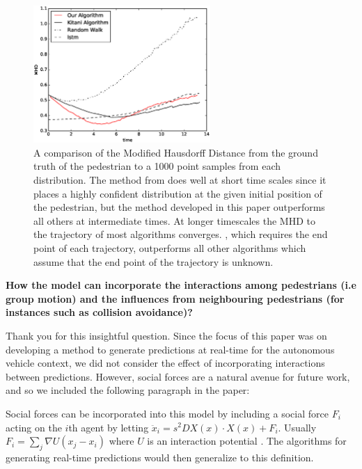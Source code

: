 \documentclass[usenames,dvipsnames]{article}
\providecommand{\response}[1]{
\noindent
\noindent\colorbox{gray!20}{
\parbox{\textwidth}{
\setlength{\parskip}{.1in}
\setlength{\parindent}{.1in}
#1}
}
}
\begin{document}
\begin{enumerate}
\begin{item}
\end{item}
\begin{figure}
	\centering
	\includegraphics[width=0.6\textwidth]{figures/mhd_results.eps}
	\caption{A comparison of the Modified Hausdorff Distance from the ground truth of the pedestrian to a 1000 point samples from each distribution. The method from \cite{Alahi2016} does well at short time scales since it places a highly confident distribution at the given initial position of the pedestrian, but the method developed in this paper outperforms all others at intermediate times. At longer timescales the MHD to the trajectory of most algorithms converges. \cite{Kitani2012}, which requires the end point of each trajectory, outperforms all other algorithms which assume that the end point of the trajectory is unknown.}
   \reversemarginpar{}
	\label{MHD}
\end{figure}

\begin{item}
\textbf{How the model can incorporate the interactions among pedestrians (i.e
group motion) and the influences from neighbouring pedestrians (for
instances such as collision avoidance)?}
\end{item}

Thank you for this insightful question. 
Since the focus of this paper was on developing a method to generate predictions at real-time for the autonomous vehicle context, we did not consider the effect of incorporating interactions between predictions. 
However, social forces are a natural avenue for future work, and so we included the following paragraph in the paper:

\reversemarginpar{}
\response{Social forces can be incorporated into this model by
	including a social force $F_{i}$ acting on the $i$th agent by letting $\ddot{x}_i = s^2 DX(x) \cdot X(x) + F_i$.  
	Usually $F_{i} = \sum_{j} \nabla U( x_j - x_i)$ where $U$ is an interaction potential \cite{Helbing1995}. 
	The algorithms for generating real-time predictions would then generalize to this definition.
}



\end{enumerate}
\end{document}
